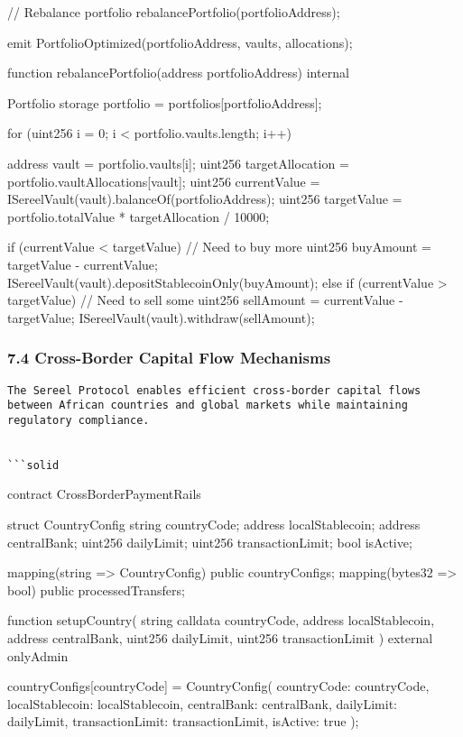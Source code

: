 \documentclass[12pt]{article}
\begin{document}
{{{        // Rebalance portfolio        rebalancePortfolio(portfolioAddress);

        emit PortfolioOptimized(portfolioAddress, vaults, allocations);    }

    function rebalancePortfolio(address portfolioAddress) internal {        Portfolio storage portfolio = portfolios[portfolioAddress];

        for (uint256 i = 0; i < portfolio.vaults.length; i++) {            address vault = portfolio.vaults[i];            uint256 targetAllocation = portfolio.vaultAllocations[vault];            uint256 currentValue = ISereelVault(vault).balanceOf(portfolioAddress);            uint256 targetValue = portfolio.totalValue * targetAllocation / 10000;

            if (currentValue < targetValue) {                // Need to buy more                uint256 buyAmount = targetValue - currentValue;                ISereelVault(vault).depositStablecoinOnly(buyAmount);            } else if (currentValue > targetValue) {                // Need to sell some                uint256 sellAmount = currentValue - targetValue;                ISereelVault(vault).withdraw(sellAmount);            }        }    }}
\subsubsection{7.4 Cross-Border Capital Flow Mechanisms} %

\begin{lstlisting}
The Sereel Protocol enables efficient cross-border capital flows between African countries and global markets while maintaining regulatory compliance.


```solid
\end{lstlisting}
contract CrossBorderPaymentRails {    struct CountryConfig {        string countryCode;        address localStablecoin;        address centralBank;        uint256 dailyLimit;        uint256 transactionLimit;        bool isActive;    }

    mapping(string => CountryConfig) public countryConfigs;    mapping(bytes32 => bool) public processedTransfers;

    function setupCountry(        string calldata countryCode,        address localStablecoin,        address centralBank,        uint256 dailyLimit,        uint256 transactionLimit    ) external onlyAdmin {        countryConfigs[countryCode] = CountryConfig({            countryCode: countryCode,            localStablecoin: localStablecoin,            centralBank: centralBank,            dailyLimit: dailyLimit,            transactionLimit: transactionLimit,            isActive: true        });

}}}
\end{document}
